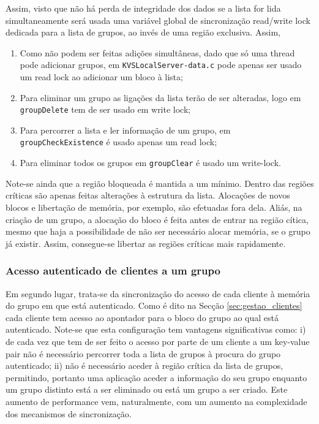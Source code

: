 Assim, visto que não há perda de integridade dos dados se a lista for lida simultaneamente será usada uma variável global de sincronização read/write lock dedicada para a lista de grupos, ao invés de uma região exclusiva. Assim, 
\begin{enumerate}[noitemsep]
    \item Como não podem ser feitas adições simultâneas, dado que só uma thread pode adicionar grupos, em \texttt{KVSLocalServer-data.c} pode apenas ser usado um read lock ao adicionar um bloco à lista;
    \item Para eliminar um grupo as ligações da lista terão de ser alteradas, logo em  \texttt{groupDelete} tem de ser usado em write lock;
    \item Para percorrer a lista e ler informação de um grupo, em \texttt{groupCheckExistence}  é usado apenas um read lock;
   \item Para eliminar todos os grupos em  \texttt{groupClear} é usado um write-lock.
\end{enumerate}

Note-se ainda que a região bloqueada é mantida a um mínimo. Dentro das regiões críticas são apenas feitas alterações à estrutura da lista. Alocações de novos blocos e libertação de memória, por exemplo, são efetuadas fora dela. Aliás, na criação de um grupo, a alocação do bloco é feita antes de entrar na região cítica, mesmo que haja a possibilidade de não ser necessário alocar memória, se o grupo já existir. Assim, consegue-se libertar as regiões críticas mais rapidamente.

\subsubsection{Acesso autenticado de clientes a um grupo}\label{sec:authgroup}
Em segundo lugar, trata-se da sincronização do acesso de cada cliente à memória do grupo em que está autenticado. Como é dito na Secção \ref{sec:gestao_clientes} cada cliente tem acesso ao apontador para o bloco do grupo ao qual está autenticado. Note-se que esta configuração tem vantagens significativas como: i) de cada vez que tem de ser feito o acesso por parte de um cliente a um key-value pair não é necessário percorrer toda a lista de grupos à procura do grupo autenticado; ii) não é necessário aceder à região crítica da lista de grupos, permitindo, portanto uma aplicação aceder a informação do seu grupo enquanto um grupo distinto está a ser eliminado ou está um grupo a ser criado. Este aumento de performance vem, naturalmente, com um aumento na complexidade dos mecanismos de sincronização. 

